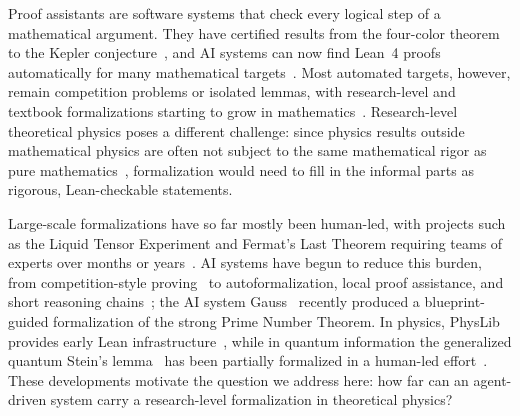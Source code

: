 \documentclass[aps,prl,twocolumn,superscriptaddress,longbibliography,10pt,footinbib]{revtex4-2}
\begin{document}
\let\SMrealaddcontentsline\addcontentsline{}
\renewcommand{\addcontentsline}[3]{}

%
Proof assistants are software systems that check every logical step of a mathematical argument. They have certified results from the four-color theorem~\cite{Gonthier2008Formal} to the Kepler conjecture~\cite{Hales2017Formal}, and AI systems can now find Lean~4 proofs automatically for many mathematical targets~\cite{Moura2021Lean,Hubert2026Olympiadlevel,Ren2025DeepSeekproverV2,Wang2025Kiminaprover,Lin2025GoedelproverV2}.
Most automated targets, however, remain competition problems or isolated lemmas, with research-level and textbook formalizations starting to grow in mathematics~\cite{MathInc.2025Strong,Rammal2026Formalizing}. Research-level theoretical physics poses a different challenge: since physics results outside mathematical physics are often not subject to the same mathematical rigor as pure mathematics~\cite{Lu2026Position}, formalization would need to fill in the informal parts as rigorous, Lean-checkable statements.

Large-scale formalizations have so far mostly been human-led, with projects such as the Liquid Tensor Experiment and Fermat's Last Theorem requiring teams of experts over months or years~\cite{Commelin2023Liquid,Gowers2025Conjecture,Best2025Complete,Buzzard2024Lean}. AI systems have begun to reduce this burden, from competition-style proving~\cite{Hubert2026Olympiadlevel,Axiom2025AxiomProver,Harmonic2025Aristotle} to autoformalization, local proof assistance, and short reasoning chains~\cite{Wu2022Autoformalization,Wang2025MALoT,Yang2023LeanDojo}; the AI system Gauss~\cite{2025Introducing,MathInc.2025Strong} recently produced a blueprint-guided formalization of the strong Prime Number Theorem.
In physics, PhysLib provides early Lean infrastructure~\cite{PhyslibContributors2024PhysLib}, while in quantum information the generalized quantum Stein's lemma~\cite{Brandao2010Generalization,Berta2023Gap,Hayashi2025Generalized,Lami2025Solution} has been partially formalized in a human-led effort~\cite{Meiburg2024LeanQuantumInfo,Meiburg2025Formalization}. These developments motivate the question we address here: how far can an agent-driven system carry a research-level formalization in theoretical physics?
\end{document}
